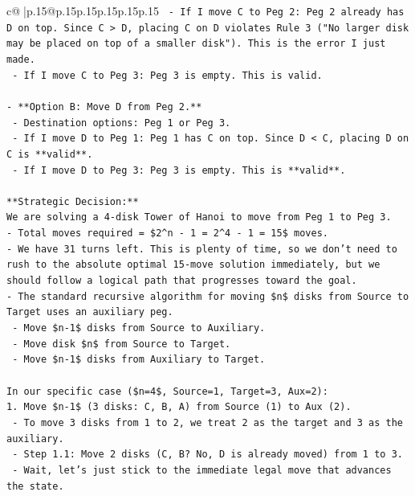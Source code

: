 \documentclass{article}
\begin{document}
{\begin{supertabular}{c@{$\;$}|p{.15\linewidth}@{}p{.15\linewidth}p{.15\linewidth}p{.15\linewidth}p{.15\linewidth}p{.15\linewidth}}
{{{\texttt{  {-} If I move C to Peg 2: Peg 2 already has D on top. Since C > D, placing C on D violates Rule 3 ("No larger disk may be placed on top of a smaller disk"). This is the error I just made.} \\
\texttt{  {-} If I move C to Peg 3: Peg 3 is empty. This is valid.} \\
\\ 
\texttt{{-} **Option B: Move D from Peg 2.**} \\
\texttt{  {-} Destination options: Peg 1 or Peg 3.} \\
\texttt{  {-} If I move D to Peg 1: Peg 1 has C on top. Since D < C, placing D on C is **valid**.} \\
\texttt{  {-} If I move D to Peg 3: Peg 3 is empty. This is **valid**.} \\
\\ 
\texttt{**Strategic Decision:**} \\
\texttt{We are solving a 4{-}disk Tower of Hanoi to move from Peg 1 to Peg 3.} \\
\texttt{{-} Total moves required = \$2\^{}n {-} 1 = 2\^{}4 {-} 1 = 15\$ moves.} \\
\texttt{{-} We have 31 turns left. This is plenty of time, so we don't need to rush to the absolute optimal 15{-}move solution immediately, but we should follow a logical path that progresses toward the goal.} \\
\texttt{{-} The standard recursive algorithm for moving \$n\$ disks from Source to Target uses an auxiliary peg.} \\
\texttt{  {-} Move \$n{-}1\$ disks from Source to Auxiliary.} \\
\texttt{  {-} Move disk \$n\$ from Source to Target.} \\
\texttt{  {-} Move \$n{-}1\$ disks from Auxiliary to Target.} \\
\\ 
\texttt{In our specific case (\$n=4\$, Source=1, Target=3, Aux=2):} \\
\texttt{1. Move \$n{-}1\$ (3 disks: C, B, A) from Source (1) to Aux (2).} \\
\texttt{   {-} To move 3 disks from 1 to 2, we treat 2 as the target and 3 as the auxiliary.} \\
\texttt{   {-} Step 1.1: Move 2 disks (C, B? No, D is already moved) from 1 to 3.} \\
\texttt{   {-} Wait, let's just stick to the immediate legal move that advances the state.} \\
\\ 
}}}
\end{supertabular}}
\end{document}
